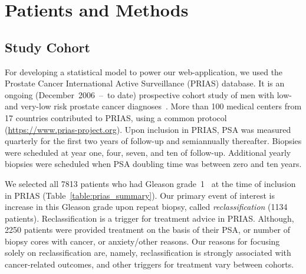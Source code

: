 \section{Patients and Methods}

\subsection{Study Cohort}
\label{subsec:cohort}
For developing a statistical model to power our web-application, we used the Prostate Cancer International Active Surveillance (PRIAS) database. It is an ongoing (December~2006~--~to date) prospective cohort study of men with low- and very-low risk prostate cancer diagnoses~\citep{bul2013active}. More than 100 medical centers from 17 countries contributed to PRIAS, using a common protocol (\url{https://www.prias-project.org}). Upon inclusion in PRIAS, PSA was measured quarterly for the first two years of follow-up and semiannually thereafter. Biopsies were scheduled at year one, four, seven, and ten of follow-up. Additional yearly biopsies were scheduled when PSA doubling time was between zero and ten years.

We selected all 7813 patients who had Gleason grade~1~\citep{epsteinGG2014} at the time of inclusion in PRIAS (Table~\ref{table:prias_summary}). Our primary event of interest is increase in this Gleason grade upon repeat biopsy, called \textit{reclassification} (1134 patients). Reclassification is a trigger for treatment advice in PRIAS. Although, 2250 patients were provided treatment on the basis of their PSA, or number of biopsy cores with cancer, or anxiety/other reasons. Our reasons for focusing solely on reclassification are, namely, reclassification is strongly associated with cancer-related outcomes, and other triggers for treatment vary between cohorts.

